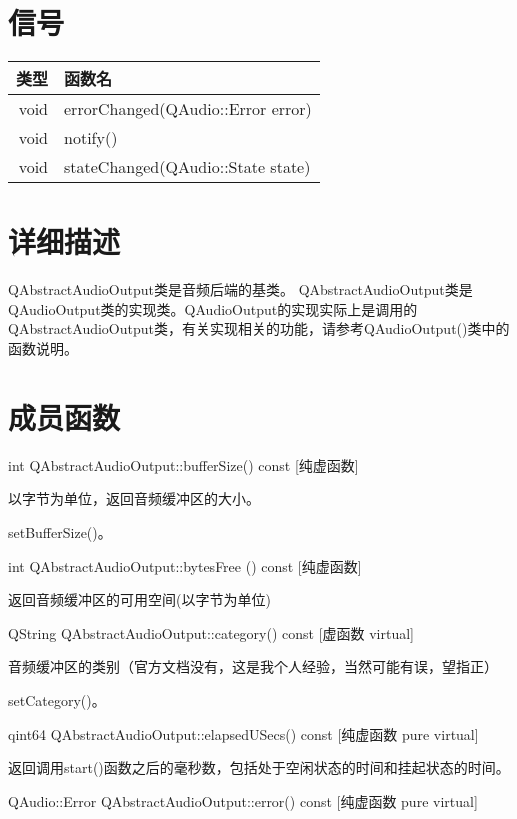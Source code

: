 \section{信号}

\begin{tabular}{|r|l|}
\hline
类型&函数名\\
\hline
void&	errorChanged(QAudio::Error error)\\
\hline
void&	notify()\\
\hline
void&	stateChanged(QAudio::State state)\\
\hline
\end{tabular}

\section{详细描述}

QAbstractAudioOutput类是音频后端的基类。 QAbstractAudioOutput类是
QAudioOutput类的实现类。QAudioOutput的实现实际上是调用的
QAbstractAudioOutput类，有关实现相关的功能，请参考QAudioOutput()类中的
函数说明。

\section{成员函数}

int QAbstractAudioOutput::bufferSize() const [纯虚函数] 

以字节为单位，返回音频缓冲区的大小。

\begin{seeAlso}
setBufferSize()。
\end{seeAlso}

int QAbstractAudioOutput::bytesFree () const [纯虚函数] 

返回音频缓冲区的可用空间(以字节为单位)

QString QAbstractAudioOutput::category() const [虚函数 virtual] 

音频缓冲区的类别（官方文档没有，这是我个人经验，当然可能有误，望指正） 

\begin{seeAlso}
setCategory()。
\end{seeAlso}

qint64 QAbstractAudioOutput::elapsedUSecs() const [纯虚函数 pure virtual] 

返回调用start()函数之后的毫秒数，包括处于空闲状态的时间和挂起状态的时间。

QAudio::Error QAbstractAudioOutput::error() const [纯虚函数 pure
virtual] 

